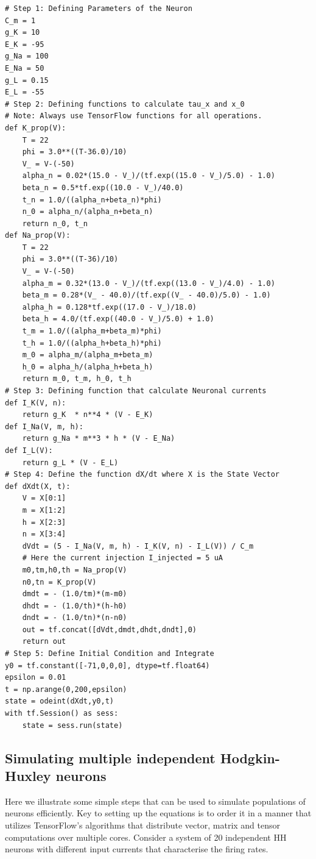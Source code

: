 \documentclass[10pt,letterpaper]{article}
\begin{document}
\begin{verbatim}
# Step 1: Defining Parameters of the Neuron 
C_m = 1
g_K = 10
E_K = -95
g_Na = 100
E_Na = 50 
g_L = 0.15
E_L = -55
# Step 2: Defining functions to calculate tau_x and x_0
# Note: Always use TensorFlow functions for all operations.
def K_prop(V):
    T = 22
    phi = 3.0**((T-36.0)/10)
    V_ = V-(-50)
    alpha_n = 0.02*(15.0 - V_)/(tf.exp((15.0 - V_)/5.0) - 1.0)
    beta_n = 0.5*tf.exp((10.0 - V_)/40.0) 
    t_n = 1.0/((alpha_n+beta_n)*phi)
    n_0 = alpha_n/(alpha_n+beta_n)
    return n_0, t_n
def Na_prop(V):
    T = 22
    phi = 3.0**((T-36)/10)
    V_ = V-(-50)
    alpha_m = 0.32*(13.0 - V_)/(tf.exp((13.0 - V_)/4.0) - 1.0)
    beta_m = 0.28*(V_ - 40.0)/(tf.exp((V_ - 40.0)/5.0) - 1.0)
    alpha_h = 0.128*tf.exp((17.0 - V_)/18.0)
    beta_h = 4.0/(tf.exp((40.0 - V_)/5.0) + 1.0)
    t_m = 1.0/((alpha_m+beta_m)*phi)
    t_h = 1.0/((alpha_h+beta_h)*phi)
    m_0 = alpha_m/(alpha_m+beta_m)
    h_0 = alpha_h/(alpha_h+beta_h)
    return m_0, t_m, h_0, t_h
# Step 3: Defining function that calculate Neuronal currents
def I_K(V, n):
    return g_K  * n**4 * (V - E_K)
def I_Na(V, m, h):
    return g_Na * m**3 * h * (V - E_Na)
def I_L(V):
    return g_L * (V - E_L)
# Step 4: Define the function dX/dt where X is the State Vector
def dXdt(X, t):
    V = X[0:1]
    m = X[1:2]
    h = X[2:3]
    n = X[3:4]
    dVdt = (5 - I_Na(V, m, h) - I_K(V, n) - I_L(V)) / C_m 
    # Here the current injection I_injected = 5 uA
    m0,tm,h0,th = Na_prop(V)
    n0,tn = K_prop(V)
    dmdt = - (1.0/tm)*(m-m0)
    dhdt = - (1.0/th)*(h-h0)
    dndt = - (1.0/tn)*(n-n0)
    out = tf.concat([dVdt,dmdt,dhdt,dndt],0)
    return out
# Step 5: Define Initial Condition and Integrate
y0 = tf.constant([-71,0,0,0], dtype=tf.float64)
epsilon = 0.01
t = np.arange(0,200,epsilon)
state = odeint(dXdt,y0,t)
with tf.Session() as sess:
    state = sess.run(state)
\end{verbatim}

\subsection*{Simulating multiple independent Hodgkin-Huxley neurons}

Here we illustrate some simple steps that can be used to simulate populations of neurons efficiently. Key to setting up the equations is to order it in a manner that utilizes TensorFlow's algorithms that distribute vector, matrix and tensor computations over multiple cores. Consider a system of 20 independent HH neurons with different input currents that characterise the firing rates. 
\end{document}
